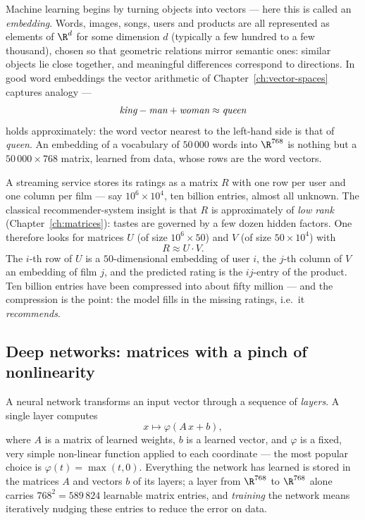 Machine learning begins by turning objects into vectors — here this is called an \emph{embedding}. Words,
images, songs, users and products are all represented as elements of $\R^d$ for some dimension $d$
(typically a few hundred to a few thousand), chosen so that geometric relations mirror semantic ones:
similar objects lie close together, and meaningful differences correspond to directions. In good word
embeddings the vector arithmetic of Chapter~\ref{ch:vector-spaces} captures analogy —
\[
\text{\itshape king} - \text{\itshape man} + \text{\itshape woman} \approx \text{\itshape queen}
\]
holds approximately: the word vector nearest to the left-hand side is that of \emph{queen}. An embedding of a vocabulary of $50\,000$ words into
$\R^{768}$ is nothing but a $50\,000\times 768$ matrix, learned from data, whose rows are the word
vectors.

\begin{example}
A streaming service stores its ratings as a matrix $R$ with one row per user and one column per film —
say $10^6\times 10^4$, ten billion entries, almost all unknown. The classical recommender-system insight
is that $R$ is approximately of \emph{low rank} (Chapter~\ref{ch:matrices}): tastes are governed by a few
dozen hidden factors. One therefore looks for matrices $U$ (of size $10^6\times 50$) and $V$ (of size
$50\times 10^4$) with
\[
R \approx U\cdot V.
\]
The $i$-th row of $U$ is a $50$-dimensional embedding of user $i$, the $j$-th column of $V$ an embedding
of film $j$, and the predicted rating is the $ij$-entry of the product. Ten billion entries have been
compressed into about fifty million — and the compression is the point: the model fills in the missing
ratings, i.e.\ it \emph{recommends}.
\end{example}

\subsection{Deep networks: matrices with a pinch of nonlinearity}

A neural network transforms an input vector through a sequence of \emph{layers}. A single layer computes
\[
x \longmapsto \varphi(A\,x + b),
\]
where $A$ is a matrix of learned weights, $b$ is a learned vector, and $\varphi$ is a fixed, very simple
non-linear function applied to each coordinate — the most popular choice is $\varphi(t) = \max(t, 0)$.
Everything the network has learned is stored in the matrices $A$ and vectors $b$ of its layers; a layer
from $\R^{768}$ to $\R^{768}$ alone carries $768^2 = 589\,824$ learnable matrix entries, and \emph{training}
the network means iteratively nudging these entries to reduce the error on data.

